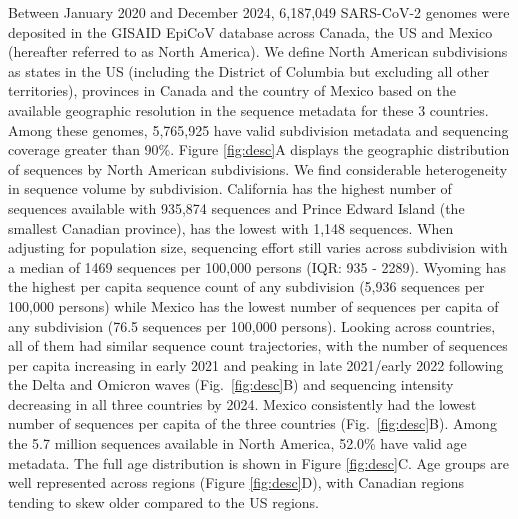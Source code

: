 \documentclass[11pt, letterpaper, oneside]{article}
\begin{document}
Between January 2020 and December 2024, 6,187,049 SARS-CoV-2 genomes were deposited in the GISAID EpiCoV database across Canada, the US and Mexico (hereafter referred to as North America).\autocite{khareGISAIDsRolePandemic2021}
We define North American subdivisions as states in the US (including the District of Columbia but excluding all other territories), provinces in Canada and the country of Mexico based on the available geographic resolution in the sequence metadata for these 3 countries.
Among these genomes, 5,765,925 have valid subdivision metadata and sequencing coverage greater than 90\%.
Figure \ref{fig:desc}A displays the geographic distribution of sequences by North American subdivisions.
We find considerable heterogeneity in sequence volume by subdivision.
California has the highest number of sequences available with 935,874 sequences and Prince Edward Island (the smallest Canadian province), has the lowest with 1,148 sequences.
When adjusting for population size, sequencing effort still varies across subdivision with a median of 1469 sequences per 100,000 persons (IQR: 935 - 2289).
Wyoming has the highest per capita sequence count of any subdivision (5,936 sequences per 100,000 persons) while Mexico has the lowest number of sequences per capita of any subdivision (76.5 sequences per 100,000 persons).
Looking across countries, all of them had similar sequence count trajectories, with the number of sequences per capita increasing in early 2021 and peaking in late 2021/early 2022 following the Delta and Omicron waves (Fig.\ \ref{fig:desc}B) and sequencing intensity decreasing in all three countries by 2024.
Mexico consistently had the lowest number of sequences per capita of the three countries (Fig.\ \ref{fig:desc}B).
Among the 5.7 million sequences available in North America, 52.0\% have valid age metadata.
The full age distribution is shown in Figure \ref{fig:desc}C.
Age groups are well represented across regions (Figure \ref{fig:desc}D), with Canadian regions tending to skew older compared to the US regions.
\end{document}
